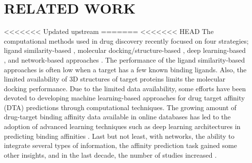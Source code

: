 \chapter{RELATED WORK}
\label{related_work}

<<<<<<< Updated upstream
=======
<<<<<<< HEAD
The computational methods used in drug discovery recently focused on four strategies; ligand similarity-based \cite{keiser2007relating}, molecular docking/structure-based \cite{morris2009autodock4,donald2011algorithms}, deep learning-based \cite{wan2018neodti, luo2017network}, and network-based approaches \cite{luo2017network, zheng2013collaborative, chen2012drug, wang2014drug}. The performance of the ligand similarity-based approaches is often low when a target has a few known binding ligands. Also, the limited availability of 3D structures of target proteins limits the molecular docking performance. Due to the limited data availability, some efforts have been devoted to developing machine learning-based approaches for drug target affinity (DTA) predictions through computational techniques. The growing amount of drug-target binding affinity data available in online databases has led to the adoption of advanced learning techniques such as deep learning architectures in predicting binding affinities \cite{chan2016large, tian2016boosting, hamanaka2017cgbvs, ozccelik2021chemboost, ozturk2018deepdta, ozturk2019widedta}. Last but not least, with networks, the ability to integrate several types of information, the affinity prediction task gained some other insights, and in the last decade, the number of studies increased \cite{wan2018neodti, luo2017network, nguyen2019graphdta}.



